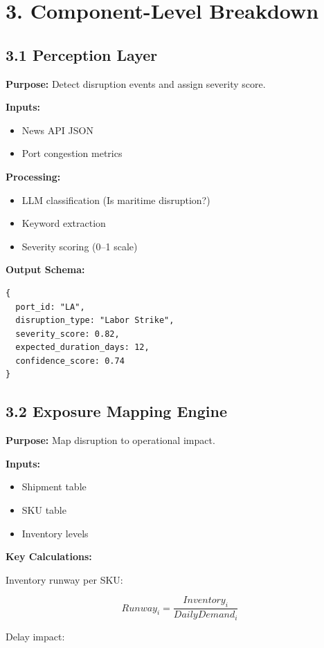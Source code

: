 \documentclass[11pt]{article}
\begin{document}
\section*{3. Component-Level Breakdown}

\subsection*{3.1 Perception Layer}

\textbf{Purpose:} Detect disruption events and assign severity score.

\textbf{Inputs:}
\begin{itemize}
    \item News API JSON
    \item Port congestion metrics
\end{itemize}

\textbf{Processing:}
\begin{itemize}
    \item LLM classification (Is maritime disruption?)
    \item Keyword extraction
    \item Severity scoring (0–1 scale)
\end{itemize}

\textbf{Output Schema:}

\begin{verbatim}
{
  port_id: "LA",
  disruption_type: "Labor Strike",
  severity_score: 0.82,
  expected_duration_days: 12,
  confidence_score: 0.74
}
\end{verbatim}

\subsection*{3.2 Exposure Mapping Engine}

\textbf{Purpose:} Map disruption to operational impact.

\textbf{Inputs:}
\begin{itemize}
    \item Shipment table
    \item SKU table
    \item Inventory levels
\end{itemize}

\textbf{Key Calculations:}

Inventory runway per SKU:

\[
Runway_i = \frac{Inventory_i}{DailyDemand_i}
\]

Delay impact:
\end{document}
